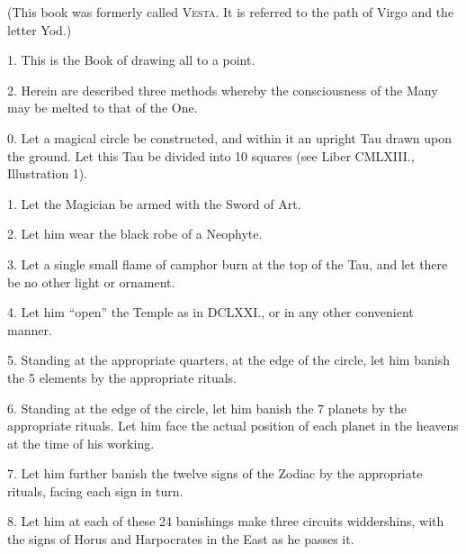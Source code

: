 

(This book was formerly called \textsc{Vesta}. It is referred to the path of Virgo and the letter Yod.)


1. This is the Book of drawing all to a point.

2. Herein are described three methods whereby the consciousness of the Many may be melted to that of the One.



0. Let a magical circle be constructed, and within it an upright Tau drawn upon the ground. Let this Tau be divided into 10 squares (see Liber CMLXIII., Illustration 1).

1. Let the Magician be armed with the Sword of Art.\footnotemark

2. Let him wear the black robe of a Neophyte.

3. Let a single small flame of camphor burn at the top of the Tau, and let there be no other light or ornament.\footnotemark[\value{footnote}]

4. Let him \enquote{open} the Temple as in DCLXXI., or in any other convenient manner.

5. Standing at the appropriate quarters, at the edge of the circle, let him banish the 5 elements by the appropriate rituals.

6. Standing at the edge of the circle, let him banish the 7 planets by the appropriate rituals. Let him face the actual position of each planet in the heavens at the time of his working.

7. Let him further banish the twelve signs of the Zodiac by the appropriate rituals, facing each sign in turn.

8. Let him at each of these 24 banishings make three circuits widdershins, with the signs of Horus and Harpocrates in the East as he passes it.

